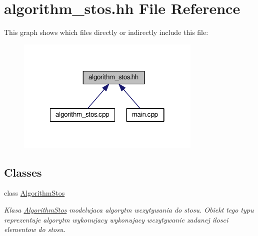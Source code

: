 \hypertarget{algorithm__stos_8hh}{}\section{algorithm\+\_\+stos.\+hh File Reference}
\label{algorithm__stos_8hh}
This graph shows which files directly or indirectly include this file\+:\nopagebreak
\begin{figure}[H]
\begin{center}
\leavevmode
\includegraphics[width=250pt]{algorithm__stos_8hh__dep__incl}
\end{center}
\end{figure}
\subsection*{Classes}
\begin{DoxyCompactItemize}
\item 
class \hyperlink{class_algorithm_stos}{Algorithm\+Stos}
\begin{DoxyCompactList}\small\item\em Klasa \hyperlink{class_algorithm_stos}{Algorithm\+Stos} modelujaca algorytm wczytywania do stosu. Obiekt tego typu reprezentuje algorytm wykonujacy wykonujacy wczytywanie zadanej ilosci elementow do stosu. \end{DoxyCompactList}\end{DoxyCompactItemize}

